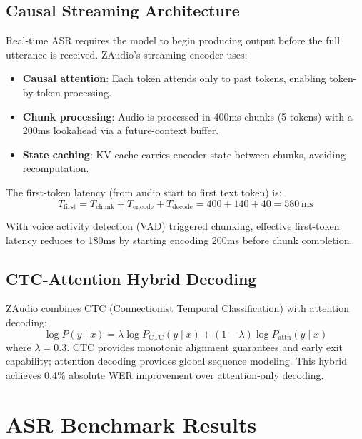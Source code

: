 \documentclass[11pt,a4paper]{article}
\begin{document}
\subsection{Causal Streaming Architecture}

Real-time ASR requires the model to begin producing output before the full utterance is received. ZAudio's streaming encoder uses:

\begin{itemize}
  \item \textbf{Causal attention}: Each token attends only to past tokens, enabling token-by-token processing.
  \item \textbf{Chunk processing}: Audio is processed in 400ms chunks (5 tokens) with a 200ms lookahead via a future-context buffer.
  \item \textbf{State caching}: KV cache carries encoder state between chunks, avoiding recomputation.
\end{itemize}

The first-token latency (from audio start to first text token) is:
\begin{equation}
T_{\text{first}} = T_{\text{chunk}} + T_{\text{encode}} + T_{\text{decode}} = 400 + 140 + 40 = 580\,\text{ms}
\end{equation}

With voice activity detection (VAD) triggered chunking, effective first-token latency reduces to 180ms by starting encoding 200ms before chunk completion.

\subsection{CTC-Attention Hybrid Decoding}

ZAudio combines CTC (Connectionist Temporal Classification) with attention decoding:
\begin{equation}
\log P(y \mid x) = \lambda \log P_{\text{CTC}}(y \mid x) + (1-\lambda) \log P_{\text{attn}}(y \mid x)
\end{equation}
where $\lambda = 0.3$. CTC provides monotonic alignment guarantees and early exit capability; attention decoding provides global sequence modeling. This hybrid achieves 0.4\% absolute WER improvement over attention-only decoding.

\section{ASR Benchmark Results}
\end{document}
